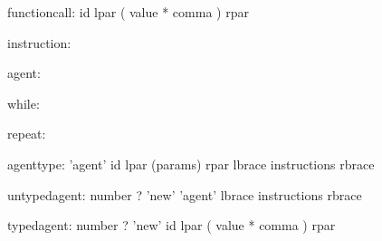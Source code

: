 \begin{rail}
	functioncall: id lpar ( value * comma ) rpar
\end{rail}

\begin{rail}
	instruction:
\end{rail}

\begin{rail}
	agent:
\end{rail}

\begin{rail}
	while:
\end{rail}

\begin{rail}
	repeat:
\end{rail}

\begin{rail}
	agenttype: 'agent' id lpar (params) rpar lbrace instructions rbrace
\end{rail}

\begin{rail}
	untypedagent: number ? 'new' 'agent' lbrace instructions rbrace
\end{rail}

\begin{rail}
	typedagent: number ? 'new' id lpar ( value * comma ) rpar
\end{rail}


